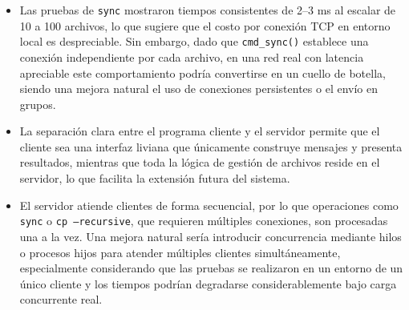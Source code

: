 \documentclass[12pt, letterpaper]{article}
\begin{document}
\begin{itemize}
    \item Las pruebas de \texttt{sync} mostraron tiempos consistentes de 
          2--3 ms al escalar de 10 a 100 archivos, lo que sugiere que el 
          costo por conexión TCP en entorno local es despreciable. Sin 
          embargo, dado que \texttt{cmd\_sync()} establece una conexión 
          independiente por cada archivo, en una red real con latencia 
          apreciable este comportamiento podría convertirse en un cuello 
          de botella, siendo una mejora natural el uso de conexiones 
          persistentes o el envío en grupos.

    \item La separación clara entre el programa cliente y el servidor 
          permite que el cliente sea una interfaz liviana que únicamente 
          construye mensajes y presenta resultados, mientras que toda la 
          lógica de gestión de archivos reside en el servidor, lo que 
          facilita la extensión futura del sistema.

    \item El servidor atiende clientes de forma secuencial, por lo que 
          operaciones como \texttt{sync} o \texttt{cp --recursive}, que 
          requieren múltiples conexiones, son procesadas una a la vez. 
          Una mejora natural sería introducir concurrencia mediante hilos 
          o procesos hijos para atender múltiples clientes simultáneamente, 
          especialmente considerando que las pruebas se realizaron en un 
          entorno de un único cliente y los tiempos podrían degradarse 
          considerablemente bajo carga concurrente real.
\end{itemize}
\end{document}
